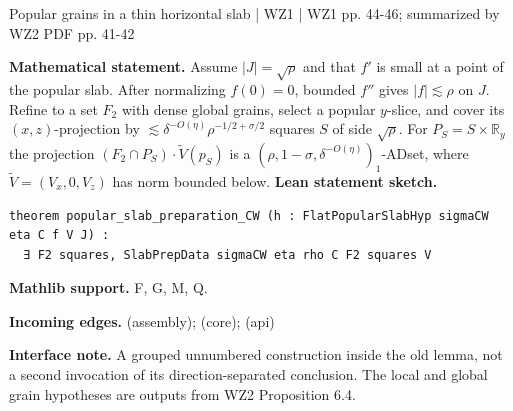 \documentclass[10pt,a4paper]{article}
\newcommand{\nodecard}[1]{\hyperlink{node-#1}{\texttt{\detokenize{#1}}}}
\begin{document}
\begin{minipage}{\linewidth}
\hypertarget{node-W1SlabPrep}{}
\begin{tcolorbox}[colback=white,colframe=slopefg,colbacktitle=slopebg,coltitle=ink,boxrule=0.45pt,arc=1.6mm,left=3mm,right=3mm,top=2mm,bottom=2mm,title={\sffamily\bfseries WZ1 Lemma 6.3: Steps 1-3 \hfill \texttt{W1SlabPrep}}]
{\sffamily\small\color{muted}Popular grains in a thin horizontal slab | WZ1 | WZ1 pp. 44-46; summarized by WZ2 PDF pp. 41-42}\par
\textbf{Mathematical statement.} Assume $|J|=\sqrt\rho$ and that $f'$ is small at a point of the popular slab.
After normalizing $f(0)=0$, bounded $f''$ gives $|f|\lesssim\rho$ on $J$.
Refine to a set $F_2$ with dense global grains, select a popular $y$-slice, and cover its $(x,z)$-projection by $\lesssim\delta^{-O(\eta)}\rho^{-1/2+\sigma/2}$ squares $S$ of side $\sqrt\rho$.
For $P_S=S\times\mathbb R_y$ the projection $(F_2\cap P_S)\cdot\widetilde V(p_S)$ is a $(\rho,1-\sigma,\delta^{-O(\eta)})_1$-ADset, where $\widetilde V=(V_x,0,V_z)$ has norm bounded below.
\smallskip\textbf{Lean statement sketch.}
\begin{Verbatim}[fontsize=\small,breaklines=true,breakanywhere=true,tabsize=2]
theorem popular_slab_preparation_CW (h : FlatPopularSlabHyp sigmaCW eta C f V J) :
  ∃ F2 squares, SlabPrepData sigmaCW eta rho C F2 squares V
\end{Verbatim}
{\footnotesize\textbf{Mathlib support.} F, G, M, Q.\par
\textbf{Incoming edges.} \nodecard{W2P6_4} (assembly); \nodecard{DAD} (core); \nodecard{Imass} (api)\par}
{\footnotesize\textbf{Interface note.} A grouped unnumbered construction inside the old lemma, not a second invocation of its direction-separated conclusion. The local and global grain hypotheses are outputs from WZ2 Proposition 6.4.}
\end{tcolorbox}\end{minipage}\par\medskip
\end{document}
